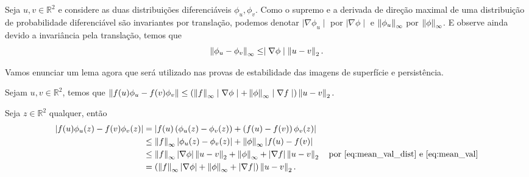 Seja $u,v\in \mathbb{R}^2$ e considere as duas distribuições diferenciáveis $\phi_u, \phi_v$. Como o supremo e 
a derivada de direção maximal de uma distribuição de probabilidade diferenciável são invariantes por translação,
podemos denotar $\mid \nabla \phi_u \mid$ por $\mid \nabla \phi \mid$ e $\left\lVert\phi_u\right\rVert_\infty$ por
$\left\lVert\phi\right\rVert_\infty$. E observe ainda devido a invariância pela translação, temos que 
\begin{equation}\label{eq:mean_val_dist}
    \left\lVert\phi_u - \phi_v\right\rVert_\infty \leq \mid \nabla \phi \mid \left\lVert u-v\right\rVert_2.
\end{equation} 

Vamos enunciar um lema agora que será utilizado nas provas de estabilidade das imagens de superfície e persistência.

\begin{lem}\label{lema:persimg}
    Sejam $u,v\in \mathbb{R}^2$, temos que $\left\lVert f(u)\phi_u - f(v)\phi_v\right\rVert \leq 
    \left( \left\lVert f\right\rVert_\infty \mid \nabla \phi \mid + \left\lVert\phi\right\rVert_\infty \mid \nabla f \mid \right) \left\lVert u-v\right\rVert_2.$
\end{lem}
\begin{demonstracao}
Seja $z\in \mathbb{R}^2$ qualquer, então
\begin{align*}
  \begin{split}
    \left\lvert f(u)\phi_u(z) - f(v)\phi_v(z)\right\rvert &= \left\lvert f(u) \left(\phi_u(z) - \phi_v(z)\right) + \left( f(u) - f(v)\right)
    \phi_v(z)\right\rvert \\
    &\leq \left\lVert f\right\rVert_\infty \left\lvert\phi_u(z) - \phi_v(z)\right\rvert + \left\lVert\phi\right\rVert_\infty \left\lvert f(u) - f(v)\right\rvert\\
    &\leq \left\lVert f\right\rVert_\infty \left\lvert\nabla \phi\right\rvert \left\lVert u-v\right\rVert_2 + \left\lVert\phi\right\rVert_\infty + \left\lvert\nabla f\right\rvert \left\lVert u-v\right\rVert_2 
     \quad \text{por \ref{eq:mean_val_dist} e \ref{eq:mean_val}}\\
    &= \left( \left\lVert f\right\rVert_\infty \left\lvert\nabla \phi\right\rvert + \left\lVert\phi\right\rVert_\infty + \left\lvert\nabla f\right\rvert\right) \left\lVert u-v\right\rVert_2.
  \end{split}
\end{align*}
\end{demonstracao}

